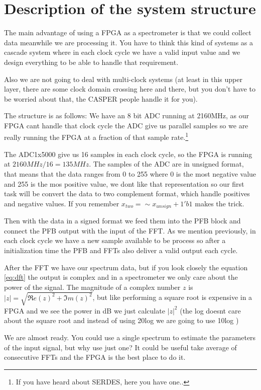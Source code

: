 \section{Description of the system structure}

The main advantage of using a FPGA as a spectrometer is that we could collect data meanwhile we are processing it. You have to think this kind of systems as a cascade system where in each clock cycle we have a valid input value and we design everything to be able to handle that requirement.

Also we are not going to deal with multi-clock systems (at least in this upper layer, there are some clock domain crossing here and there, but you don't have to be worried about that, the CASPER people handle it for you). 


The structure is as follows: We have an 8 bit ADC running at 2160MHz, as our FPGA cant handle that clock cycle the ADC give us parallel samples so we are really running the FPGA at a fraction of that sample rate.\footnote{If you have heard about SERDES, here you have one..}

The ADC1x5000 give us 16 samples in each clock cycle, so the FPGA is running at $2160MHz/16 = 135MHz$.
The samples of the ADC are in unsigned format, that means that the data ranges from 0 to 255 where 0 is the most negative value and 255 is the mos positive value, we dont like that representation so our first task will be convert the data to two complement format, which handle positives and negative values.
If you remember $x_{two} = \sim x_{unsign}+1'b1$ makes the trick.


Then with the data in a signed format we feed them into the PFB block and connect the PFB output with the input of the FFT. 
As we mention previously, in each clock cycle we have a new sample available to be process so after a initialization time the PFB and FFTs also deliver a valid output each cycle.


After the FFT we have our spectrum data, but if you look closely the equation \ref{eq:dft} the output is complex and in a spectrometer we only care about the power of the signal. The magnitude of a complex number $z$ is $|z| = \sqrt{\Re e(z)^2+\Im m(z)^2}$, but like performing a square root is expensive in a FPGA and we see the power in dB we just calculate $|z|^2$ (the log doesnt care about the square root and instead of using 20log we are going to use 10log )


We are almost ready. You could use a single spectrum to estimate the parameters of the input signal, but why use just one? It could be useful take average of consecutive FFTs and the FPGA is the best place to do it. 

